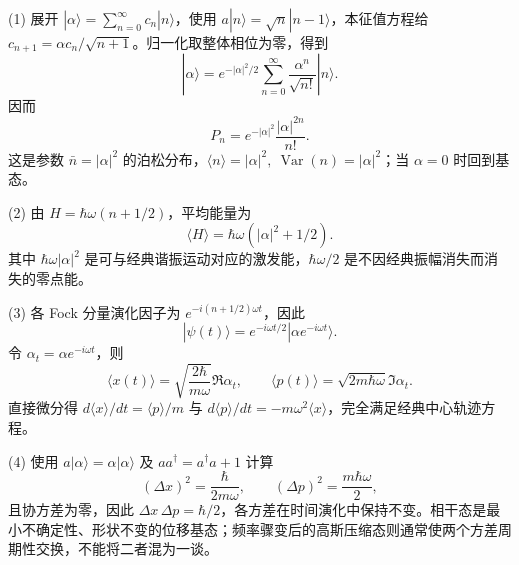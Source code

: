 (1) 展开 \(|\alpha\rangle=\sum_{n=0}^\infty c_n|n\rangle\)，使用 \(a|n\rangle=\sqrt n|n-1\rangle\)，本征值方程给 \(c_{n+1}=\alpha c_n/\sqrt{n+1}\)。归一化取整体相位为零，得到
\[
|\alpha\rangle=e^{-|\alpha|^2/2}\sum_{n=0}^\infty\frac{\alpha^n}{\sqrt{n!}}|n\rangle.
\]
因而
\[
P_n=e^{-|\alpha|^2}\frac{|\alpha|^{2n}}{n!}.
\]
这是参数 \(\bar n=|\alpha|^2\) 的泊松分布，\(\langle n\rangle=|\alpha|^2,\ \operatorname{Var}(n)=|\alpha|^2\)；当 \(\alpha=0\) 时回到基态。

(2) 由 \(H=\hbar\omega(n+1/2)\)，平均能量为
\[
\langle H\rangle=\hbar\omega(|\alpha|^2+1/2).
\]
其中 \(\hbar\omega|\alpha|^2\) 是可与经典谐振运动对应的激发能，\(\hbar\omega/2\) 是不因经典振幅消失而消失的零点能。

(3) 各 Fock 分量演化因子为 \(e^{-i(n+1/2)\omega t}\)，因此
\[
|\psi(t)\rangle=e^{-i\omega t/2}|\alpha e^{-i\omega t}\rangle.
\]
令 \(\alpha_t=\alpha e^{-i\omega t}\)，则
\[
\langle x(t)\rangle=\sqrt{\frac{2\hbar}{m\omega}}\Re\alpha_t,\qquad
\langle p(t)\rangle=\sqrt{2m\hbar\omega}\Im\alpha_t.
\]
直接微分得 \(d\langle x\rangle/dt=\langle p\rangle/m\) 与 \(d\langle p\rangle/dt=-m\omega^2\langle x\rangle\)，完全满足经典中心轨迹方程。

(4) 使用 \(a|\alpha\rangle=\alpha|\alpha\rangle\) 及 \(aa^\dagger=a^\dagger a+1\) 计算
\[
(\Delta x)^2=\frac{\hbar}{2m\omega},\qquad
(\Delta p)^2=\frac{m\hbar\omega}{2},
\]
且协方差为零，因此 \(\Delta x\,\Delta p=\hbar/2\)，各方差在时间演化中保持不变。相干态是最小不确定性、形状不变的位移基态；频率骤变后的高斯压缩态则通常使两个方差周期性交换，不能将二者混为一谈。
